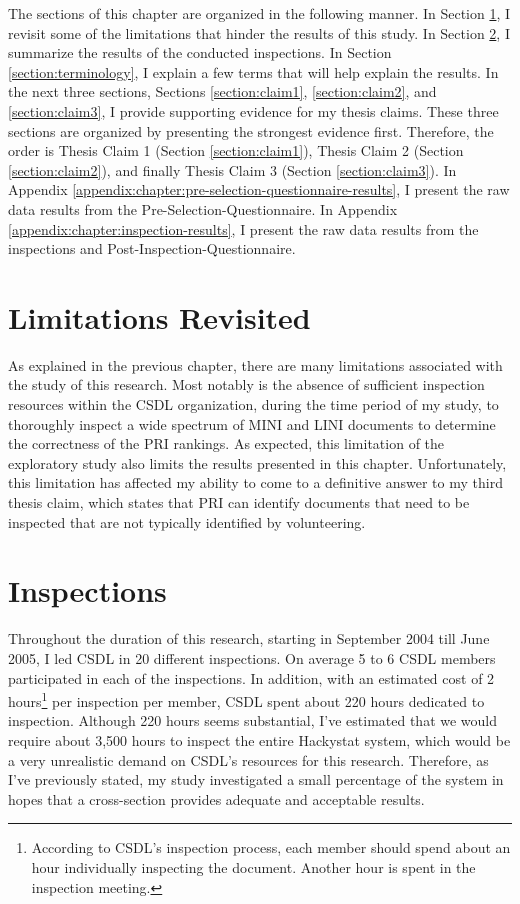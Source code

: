 The sections of this chapter are organized in the following manner. In
Section \ref{section:limitations}, I revisit some of the limitations that
hinder the results of this study. In Section \ref{section:inspections}, I
summarize the results of the conducted inspections. In Section
\ref{section:terminology}, I explain a few terms that will help explain the
results. In the next three sections, Sections \ref{section:claim1},
\ref{section:claim2}, and \ref{section:claim3}, I provide supporting
evidence for my thesis claims.  These three sections are organized by
presenting the strongest evidence first. Therefore, the order is Thesis
Claim 1 (Section \ref{section:claim1}), Thesis Claim 2 (Section
\ref{section:claim2}), and finally Thesis Claim 3 (Section
\ref{section:claim3}). In Appendix
\ref{appendix:chapter:pre-selection-questionnaire-results}, I present the
raw data results from the Pre-Selection-Questionnaire. In Appendix
\ref{appendix:chapter:inspection-results}, I present the raw data results
from the inspections and Post-Inspection-Questionnaire.


\section{Limitations Revisited}
\label{section:limitations}
As explained in the previous chapter, there are many limitations associated
with the study of this research. Most notably is the absence of sufficient
inspection resources within the CSDL organization, during the time period
of my study, to thoroughly inspect a wide spectrum of MINI and LINI
documents to determine the correctness of the PRI rankings. As expected,
this limitation of the exploratory study also limits the results presented
in this chapter. Unfortunately, this limitation has affected my ability to
come to a definitive answer to my third thesis claim, which states that PRI
can identify documents that need to be inspected that are not typically
identified by volunteering.

\section{Inspections}
\label{section:inspections}
Throughout the duration of this research, starting in September 2004 till
June 2005, I led CSDL in 20 different inspections. On average 5 to 6 CSDL
members participated in each of the inspections. In addition, with an
estimated cost of 2 hours\footnote{According to CSDL's inspection process,
  each member should spend about an hour individually inspecting the
  document. Another hour is spent in the inspection meeting.} per
inspection per member, CSDL spent about 220 hours dedicated to inspection.
Although 220 hours seems substantial, I've estimated that we would require
about 3,500 hours to inspect the entire Hackystat system, which would be a
very unrealistic demand on CSDL's resources for this research. Therefore,
as I've previously stated, my study investigated a small percentage of the
system in hopes that a cross-section provides adequate and acceptable
results.

